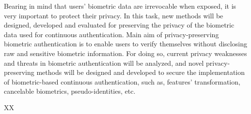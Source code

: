\begin{Workpackage}{\thewpno}
\begin{Task}
\TaskResults{%
}
\TaskHeader{}
Bearing in mind that users' biometric data are irrevocable when exposed, it is very important to protect their privacy. In this task, new methods will be designed, developed and evaluated for preserving the privacy of the biometric data used for continuous authentication. Main aim of privacy-preserving biometric authentication is to enable users to verify themselves without disclosing raw and sensitive biometric information. For doing so, current privacy weaknesses and threats in biometric authentication will be analyzed, and novel privacy-preserving methods will be designed and developed to secure the implementation of biometric-based continuous authentication, such as, features' transformation, cancelable biometrics, pseudo-identities, etc.
\end{Task}


\begin{WPDeliverables}
  \begin{compactitem}
    \item XX
\end{compactitem}
\end{WPDeliverables}
\end{Workpackage}
